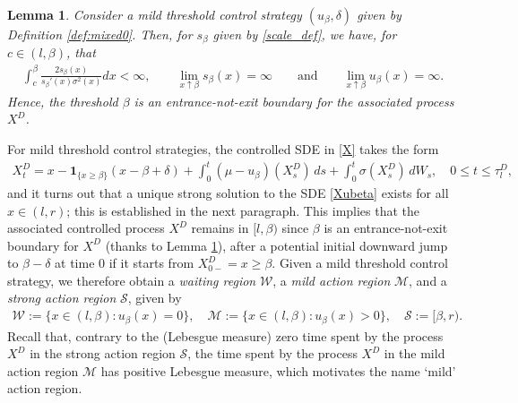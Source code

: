 \documentclass[11pt]{article} %
\newtheorem{lemma}[theorem]{Lemma}
\numberwithin{komcounter}{section}
\begin{document}
\begin{lemma}\label{scale_properties_lemma}
Consider a mild threshold control strategy $(u_\beta,\delta)$ given by Definition \ref{def:mixed0}. 
Then, for $s_\beta$ given by \eqref{scale_def}, we have, for $c\in (l,\beta)$, that  
\begin{align}\label{non-exit-entrance-cond2}
\int_c^{\beta}\frac{2s_\beta(x)}{s_\beta'(x)\sigma^2(x)}dx<\infty, 
\qquad \lim_{x\uparrow\beta}s_{\beta}(x)=\infty
\qquad \text{and} \qquad 
\lim_{x\uparrow \beta} u_\beta(x) = \infty.
\end{align}
Hence, the threshold $\beta$ is an entrance-not-exit boundary for the associated process $X^D$.
\end{lemma}
For mild threshold control strategies, the  controlled SDE in \eqref{X} takes the form
\begin{align} \label{Xubeta}
X_t^{D} = 
x - \mathbf{1}_{\{x \geq \beta\}}(x-\beta+\delta)
+ \int_0^t (\mu - u_\beta)(X_s^{D}) \, ds + \int_0^t \sigma(X_s^{D}) \, dW_s, 
\quad  0 \leq t \leq \tau^D_l,
\end{align}
and it turns out that a unique strong solution to the SDE \eqref{Xubeta} exists for all $x \in (l,r)$; this is established in the next paragraph. 
This implies that the associated controlled process $X^D$ remains in $[l,\beta)$ since $\beta$ is an entrance-not-exit boundary for $X^D$ (thanks to Lemma \ref{scale_properties_lemma}), after a potential initial downward jump to $\beta-\delta$ at time $0$ if it starts from $X^D_{0-} = x \geq \beta$.
Given a mild threshold control strategy, we therefore obtain  
a \textit{waiting region} $\mathcal{W}$, 
a \textit{mild action region} $\mathcal{M}$, 
and 
a \textit{strong action region} $\mathcal{S}$, given by
\begin{align}\label{2412rf}
\mathcal{W}:=\{x\in(l,\beta) :u_\beta(x) = 0\},  \quad
\mathcal{M}:=\{x\in(l,\beta) :u_\beta(x) > 0\}, \quad 
\mathcal{S}:= [\beta,r).
\end{align}
Recall that, contrary to the (Lebesgue measure) zero time spent by the process $X^D$ in the strong action region $\mathcal{S}$, the time spent by the process $X^D$ in the mild action region $\mathcal{M}$ has positive Lebesgue measure, which motivates the name `mild' action region. 
\end{document}
